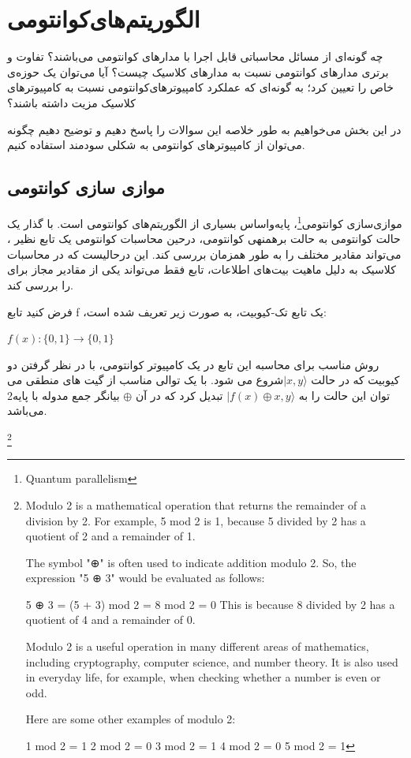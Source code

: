 \documentclass{book}
\begin{document}
\chapter{الگوریتم‌های‌کوانتومی‌}


چه گونه‌ای از مسائل محاسباتی قابل اجرا با مدارهای کوانتومی می‌باشند؟ 
تفاوت و برتری مدار‌های کوانتومی نسبت به مدار‌های کلاسیک چیست؟
آیا می‌توان یک حوزه‌ی خاص را تعیین کرد؛ به گونه‌ای که عملکرد کامپیوترهای‌‌کوانتومی نسبت به کامپیوتر‌های کلاسیک مزیت داشته باشند؟

در این بخش می‌خواهیم به طور خلاصه این سوالات را پاسخ دهیم و توضیح دهیم چگونه می‌توان از کامپیوتر‌های کوانتومی به شکلی سودمند استفاده کنیم.

\section{موازی سازی کوانتومی}

موازی‌سازی کوانتومی\footnote{Quantum parallelism}، پایه‌واساس بسیاری از الگوریتم‌های کوانتومی است. با گذار یک حالت کوانتومی به حالت برهمنهی کوانتومی، درحین محاسبات کوانتومی یک تابع نظیر ، می‌تواند مقادیر مختلف  را به طور همزمان بررسی کند. این درحالیست که در محاسبات کلاسیک به دلیل ماهیت بیت‌های اطلاعات، تابع  فقط می‌تواند یکی از مقادیر مجاز برای  را بررسی کند.


فرض کنید تابع f ،یک تابع تک-کیوبیت، به صورت زیر تعریف شده است:\\
\begin{center}
	$f (x) : \{0, 1\} \rightarrow \{0, 1\}$\\
\end{center}

روش مناسب برای محاسبه این تابع در یک کامپیوتر کوانتومی، با در نظر گرفتن دو کیوبیت که در حالت $\vert x, y\rangle$شروع می شود. با یک توالی مناسب از گیت های منطقی می توان این حالت را به $\vert f(x) \oplus x, y\rangle$ تبدیل کرد که در آن $\oplus$ بیانگر جمع مدوله با پایه‌2 می‌باشد.

\footnote{Modulo 2 is a mathematical operation that returns the remainder of a division by 2. For example, 5 mod 2 is 1, because 5 divided by 2 has a quotient of 2 and a remainder of 1.
	
	The symbol "⊕" is often used to indicate addition modulo 2. So, the expression "5 ⊕ 3" would be evaluated as follows:
	
	5 ⊕ 3 = (5 + 3) mod 2 = 8 mod 2 = 0
	This is because 8 divided by 2 has a quotient of 4 and a remainder of 0.
	
	Modulo 2 is a useful operation in many different areas of mathematics, including cryptography, computer science, and number theory. It is also used in everyday life, for example, when checking whether a number is even or odd.
	
	Here are some other examples of modulo 2:
	
	1 mod 2 = 1
	2 mod 2 = 0
	3 mod 2 = 1
	4 mod 2 = 0
	5 mod 2 = 1}
\end{document}
